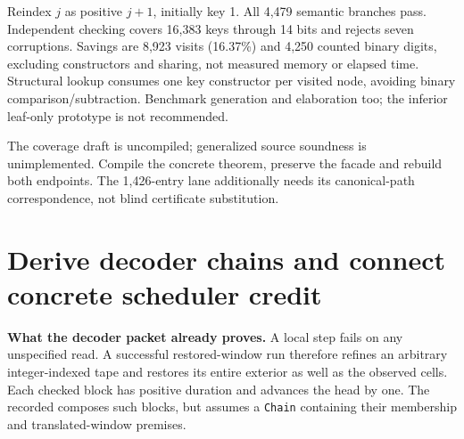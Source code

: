 \documentclass[11pt]{article}
\newcommand{\file}[1]{{\small\path{#1}}}
\newcommand{\code}[1]{\texttt{#1}}
\begin{document}
Reindex $j$ as positive $j+1$, initially key 1. All 4,479 semantic branches pass. Independent checking covers 16,383 keys through 14 bits and rejects seven corruptions. Savings are 8,923 visits (16.37\%) and 4,250 counted binary digits, excluding constructors and sharing, not measured memory or elapsed time. Structural lookup consumes one key constructor per visited node, avoiding binary comparison/subtraction. Benchmark generation and elaboration too; the inferior leaf-only prototype is not recommended.

The coverage draft is uncompiled; generalized source soundness is unimplemented. Compile the concrete theorem, preserve the facade and rebuild both endpoints. The 1,426-entry lane additionally needs its canonical-path correspondence, not blind certificate substitution.

\newpage
\section{Derive decoder chains and connect concrete scheduler credit}
\textbf{What the decoder packet already proves.} A local step fails on any unspecified read. A successful restored-window run therefore refines an arbitrary integer-indexed tape and restores its entire exterior as well as the observed cells. Each checked block has positive duration and advances the head by one. The recorded \file{chain_sound} composes such blocks, but assumes a \code{Chain} containing their membership and translated-window premises.
\end{document}
